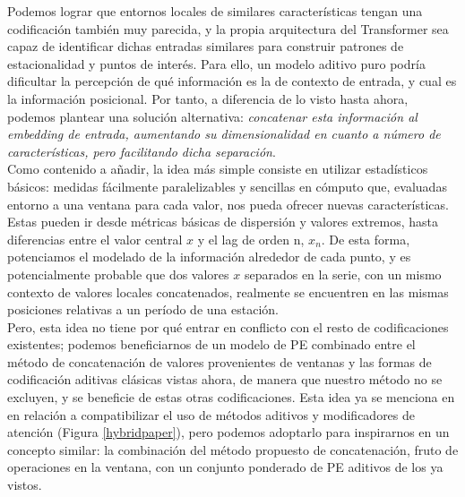 Podemos lograr que entornos locales de similares características tengan una codificación también muy parecida, y la propia arquitectura del Transformer sea capaz de identificar dichas entradas similares para construir patrones de estacionalidad y puntos de interés. Para ello, un modelo aditivo puro podría dificultar la percepción de qué información es la de contexto de entrada, y cual es la información posicional. Por tanto, a diferencia de lo visto hasta ahora, podemos plantear una solución alternativa: \emph{concatenar esta información al embedding de entrada, aumentando su dimensionalidad en cuanto a número de características, pero facilitando dicha separación}.\\

Como contenido a añadir, la idea más simple consiste en utilizar estadísticos básicos: medidas fácilmente paralelizables y sencillas en cómputo que, evaluadas entorno a una ventana para cada valor, nos pueda ofrecer nuevas características. Estas pueden ir desde métricas básicas de dispersión y valores extremos, hasta diferencias entre el valor central $x$ y el lag de orden n, $x_n$. De esta forma, potenciamos el modelado de la información alrededor de cada punto, y es potencialmente probable que dos valores $x$ separados en la serie, con un mismo contexto de valores locales concatenados, realmente se encuentren en las mismas posiciones relativas a un período de una estación.\\

Pero, esta idea no tiene por qué entrar en conflicto con el resto de codificaciones existentes; podemos beneficiarnos de un modelo de PE combinado entre el método de concatenación de valores provenientes de ventanas y las formas de codificación aditivas clásicas vistas ahora, de manera que nuestro método no se excluyen, y se beneficie de estas otras codificaciones. Esta idea ya se menciona en \cite{irani2025positionalencodingtransformerbasedtime} en relación a compatibilizar el uso de métodos aditivos y modificadores de atención (Figura \ref{hybridpaper}), pero podemos adoptarlo para inspirarnos en un concepto similar: la combinación del método propuesto de concatenación, fruto de operaciones en la ventana, con un conjunto ponderado de PE aditivos de los ya vistos.\\


